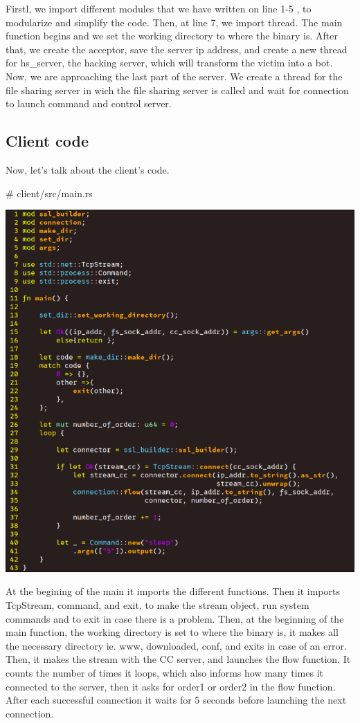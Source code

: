 \documentclass[../main.tex]{subfiles}
\begin{document}
    Firstl, we import different modules that we have written on line 1-5 , to modularize and simplify the code.
    Then, at line 7, we import thread.
    The main function begins and we set the working directory to where the binary is.
    After that, we create the acceptor, save the server ip address, and create a new thread for hs\_server, the hacking server, which will transform the victim into a bot.
    Now, we are approaching the last part of the server.
    We create a thread for the file sharing server in wich the file sharing server is called and wait for connection to launch command and control server.

    
	\vspace{10pt}

	\subsection{Client code}

    Now, let's talk about the client's code.

    \# client/src/main.rs

    \includegraphics[width=450pt]{client_main.png}

    At the begining of the main it imports the different functions.
    Then it imports TcpStream, command, and exit, to make the stream object, run system commands and to exit in case there is a problem.
    Then, at the beginning of the main function, the working directory is set to where the binary is, it makes all the necessary directory ie. www, downloaded, conf, and exits in case of an error.
    Then, it makes the stream with the CC server, and launches the flow function. 
    It counts the number of times it loops, which also informs how many times it connected to the server, then it asks for order1 or order2 in the flow function.
    After each successful connection it waits for 5 seconds before launching the next connection.
\end{document}
